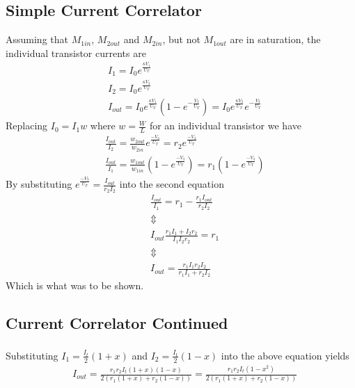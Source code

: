 \subsection{Simple Current Correlator}
Assuming that \(M_{1in}\), \(M_{2out}\) and \(M_{2in}\), but not \(M_{1out}\) are in saturation, the individual transistor currents are
\begin{align*}
    &I_1 = I_0e^{\frac{\kappa V_1}{U_T}} \\
    &I_2 = I_0e^{\frac{\kappa V_2}{U_T}} \\
    &I_{out} = I_0e^{\frac{\kappa V_1}{U_T}}\left(1-e^{-\frac{V_3}{U_T}}\right) = I_0e^{\frac{\kappa V_2}{U_T}}e^{-\frac{V_3}{U_T}}
\end{align*}
Replacing \(I_0 = I_1w\) where \(w=\frac{W}{L}\) for an individual transistor we have
\begin{align*}
    &\frac{I_{out}}{I_2} = \frac{w_{2out}}{w_{2in}}e^{\frac{-V_3}{U_T}} = r_2e^{\frac{-V_3}{U_T}} \\
    &\frac{I_{out}}{I_1} = \frac{w_{1out}}{w_{1in}}\left(1-e^{\frac{-V_3}{U_T}}\right) = r_1\left(1-e^{\frac{-V_3}{U_T}}\right)
\end{align*}
By substituting \(e^{\frac{-V_3}{U_T}}=\frac{I_{out}}{r_2I_2}\) into the second equation
\begin{align*}
    &\frac{I_{out}}{I_1} = r_1-\frac{r_1I_{out}}{r_2I_2} \\
    &\Updownarrow \\
    &I_{out}\frac{r_1I_1+I_2r_2}{I_1I_2r_2} = r_1 \\
    &\Updownarrow \\
    &I_{out} = \frac{r_1I_1r_2I_2}{r_1I_1+r_2I_2}
\end{align*}
Which is what was to be shown.

\subsection{Current Correlator Continued}
\subsubsection{}
Substituting \(I_1=\frac{I_t}{2}(1+x)\) and \(I_2=\frac{I_t}{2}(1-x)\) into the above equation yields
\begin{align*}
    &I_{out} = \frac{r_1r_2I_t(1+x)(1-x)}{2\left(r_1(1+x)+r_2(1-x)\right)} = \frac{r_1r_2I_t(1-x^2)}{2\left(r_1(1+x)+r_2(1-x)\right)}
\end{align*}
